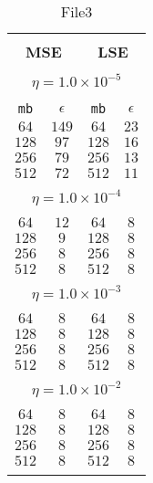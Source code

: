 \vspace*{\fill}
\begin{center}

\begin{table}[]
  \small
  
\begin{center}
\caption{File3}\label{tab:lse1}
\begin{tabular}{@{}cc|cc@{}}

\hline\\[-11pt]
\hline\\[-6.5pt]
\multicolumn{2}{c}{\bf MSE} & \multicolumn{2}{c}{\bf LSE } \\[5pt]
\hline\\[-11pt]
\multicolumn{4}{c}{$\eta = 1.0\times 10^{-5}$} \\[5pt]
\hline\\[-11pt]
\texttt{mb} & \texttt{$\epsilon$} & \texttt{mb} & \texttt{$\epsilon$} \\[1pt]
$64$ & $149$& $64$ & $23$ \\ [1pt] 
$128$ & $97$ & $128$ & $16$ \\[1pt] 
$256$ & $79$ & $256$ & $13$ \\[1pt] 
$512$ & $72$ & $512$ & $11$ \\[1pt] 
\hline\\[-11pt]
\multicolumn{4}{c}{$\eta = 1.0\times 10^{-4}$} \\[5pt]
\hline\\[-11pt]
$64$ & $12$ & $64$ & $8$ \\ [1pt]
$128$ & $9$ & $128$ & $8$ \\ [1pt]
$256$ & $8$ & $256$ & $8$ \\ [1pt]
$512$ & $8$ & $512$ & $8$ \\ [1pt]
\hline\\[-11pt]
\multicolumn{4}{c}{$\eta = 1.0\times 10^{-3}$} \\[5pt]
\hline\\[-11pt]
$64$ & $8$ & $64$ & $8$ \\ [1pt]
$128$ & $8$ & $128$ & $8$ \\ [1pt]
$256$ & $8$ & $256$ & $8$ \\ [1pt]
$512$ & $8$ & $512$ & $8$ \\ [1pt]
\hline\\[-11pt]

\multicolumn{4}{c}{$\eta = 1.0\times 10^{-2}$} \\[5pt]
\hline\\[-11pt]
$64$ & $8$ & $64$ & $8$ \\ [1pt]
$128$ & $8$ & $128$ & $8$ \\ [1pt]
$256$ & $8$ & $256$ & $8$ \\ [1pt]
$512$ & $8$ & $512$ & $8$ \\ [1pt]
\hline\\[-11pt]


\end{tabular}
\end{center}
\end{table}
\end{center}
